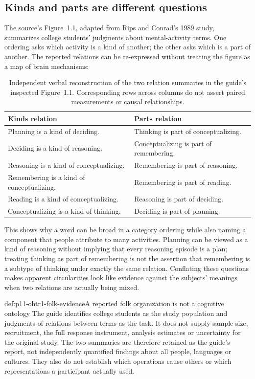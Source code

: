 \subsection{Kinds and parts are different questions}

The source's Figure~1.1, adapted from Rips and Conrad's 1989 study, summarizes
college students' judgments about mental-activity terms. One ordering asks
which activity is a kind of another; the other asks which is a part of
another. The reported relations can be re-expressed without treating the
figure as a map of brain mechanisms:

\begin{table}[htbp]
\centering\small
\begin{tabular}{p{}p{}}
Kinds relation & Parts relation\\ \hline
Planning is a kind of deciding. & Thinking is part of conceptualizing.\\
Deciding is a kind of reasoning. & Conceptualizing is part of remembering.\\
Reasoning is a kind of conceptualizing. & Remembering is part of reasoning.\\
Remembering is a kind of conceptualizing. & Remembering is part of reading.\\
Reading is a kind of conceptualizing. & Reasoning is part of deciding.\\
Conceptualizing is a kind of thinking. & Deciding is part of planning.
\end{tabular}
\caption{Independent verbal reconstruction of the two relation summaries in
the guide's inspected Figure~1.1. Corresponding rows across columns do not
assert paired measurements or causal relationships.}
\label{tab:p11-ohtr1-folk-relations}
\end{table}

This shows why a word can be broad in a category ordering while also naming
a component that people attribute to many activities. Planning can be viewed
as a kind of reasoning without implying that every reasoning episode is a
plan; treating thinking as part of remembering is not the assertion that
remembering is a subtype of thinking under exactly the same relation.
Conflating these questions makes apparent circularities look like evidence
against the subjects' meanings when two relations are actually being mixed.

\begin{proofboundary}{def:p11-ohtr1-folk-evidence}{A reported folk organization is not a cognitive ontology}
The guide identifies college students as the study population and judgments
of relations between terms as the task. It does not supply sample size,
recruitment, the full response instrument, analysis estimates or uncertainty
for the original study. The two summaries are therefore retained as the
guide's report, not independently quantified findings about all people,
languages or cultures. They also do not establish which operations cause
others or which representations a participant actually used.
\end{proofboundary}

